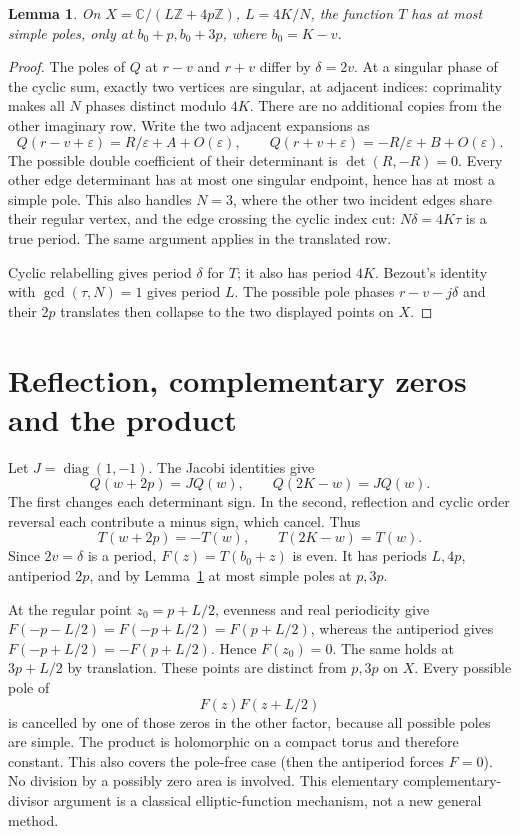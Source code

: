 \documentclass[11pt]{article}
\newtheorem{lemma}[theorem]{Lemma}
\begin{document}
\begin{lemma}\label{lem:poles}
On $X=\mathbb C/(L\mathbb Z+4p\mathbb Z)$, $L=4K/N$, the function
$T$ has at most simple poles, only at $b_0+p,b_0+3p$, where $b_0=K-v$.
\end{lemma}
\begin{proof}
The poles of $Q$ at $r-v$ and $r+v$ differ by $\delta=2v$.
At a singular phase of the cyclic sum, exactly two vertices are singular,
at adjacent indices: coprimality makes all $N$ phases distinct modulo
$4K$. There are no additional copies from the other imaginary row.
Write the two adjacent expansions as
\[
 Q(r-v+\varepsilon)=R/\varepsilon+A+O(\varepsilon),\qquad
 Q(r+v+\varepsilon)=-R/\varepsilon+B+O(\varepsilon).
\]
The possible double coefficient of their determinant is
$\det(R,-R)=0$. Every other edge determinant has at most one singular
endpoint, hence has at most a simple pole. This also handles $N=3$,
where the other two incident edges share their regular vertex, and the
edge crossing the cyclic index cut: $N\delta=4K\tau$ is a true period.
The same argument applies in the translated row.

Cyclic relabelling gives period $\delta$ for $T$; it also has period
$4K$. Bezout's identity with $\gcd(\tau,N)=1$ gives period $L$.
The possible pole phases $r-v-j\delta$ and their $2p$ translates
then collapse to the two displayed points on $X$.
\end{proof}

\section{Reflection, complementary zeros and the product}
Let $J=\operatorname{diag}(1,-1)$. The Jacobi identities give
\[
 Q(w+2p)=JQ(w),\qquad Q(2K-w)=JQ(w).
\]
The first changes each determinant sign. In the second, reflection and
cyclic order reversal each contribute a minus sign, which cancel. Thus
\begin{equation}\label{eq:characters}
 T(w+2p)=-T(w),\qquad T(2K-w)=T(w).
\end{equation}
Since $2v=\delta$ is a period, $F(z)=T(b_0+z)$ is even.
It has periods $L,4p$, antiperiod $2p$, and by Lemma~\ref{lem:poles}
at most simple poles at $p,3p$.

At the regular point $z_0=p+L/2$, evenness and real periodicity give
$F(-p-L/2)=F(-p+L/2)=F(p+L/2)$, whereas the antiperiod gives
$F(-p+L/2)=-F(p+L/2)$. Hence $F(z_0)=0$.
The same holds at $3p+L/2$ by translation. These points are distinct
from $p,3p$ on $X$. Every possible pole of
\begin{equation}\label{eq:product}
 F(z)F(z+L/2)
\end{equation}
is cancelled by one of those zeros in the other factor, because all
possible poles are simple. The product is holomorphic on a compact
torus and therefore constant. This also covers the pole-free case
(then the antiperiod forces $F=0$). No division by a possibly zero
area is involved. This elementary complementary-divisor argument is a
classical elliptic-function mechanism, not a new general method.
\end{document}
